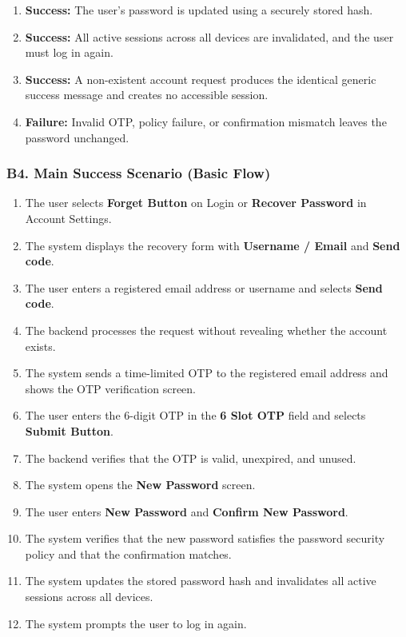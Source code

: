 \documentclass[12pt]{article}
\begin{document}
\begin{enumerate}
\item \textbf{Success:} The user's password is updated using a securely stored hash.
\item \textbf{Success:} All active sessions across all devices are invalidated, and the user must log in again.
\item \textbf{Success:} A non-existent account request produces the identical generic success message and creates no accessible session.
\item \textbf{Failure:} Invalid OTP, policy failure, or confirmation mismatch leaves the password unchanged.
\end{enumerate}
\par\medskip

\hypertarget{sec:b4-main-success-scenario-basic-flow}{}
\subsubsection*{B4. Main Success Scenario (Basic Flow)}
\par\medskip

\begin{enumerate}
\item The user selects \textbf{Forget Button} on Login or \textbf{Recover Password} in Account Settings.
\item The system displays the recovery form with \textbf{Username / Email} and \textbf{Send code}.
\item The user enters a registered email address or username and selects \textbf{Send code}.
\item The backend processes the request without revealing whether the account exists.
\item The system sends a time-limited OTP to the registered email address and shows the OTP verification screen.
\item The user enters the 6-digit OTP in the \textbf{6 Slot OTP} field and selects \textbf{Submit Button}.
\item The backend verifies that the OTP is valid, unexpired, and unused.
\item The system opens the \textbf{New Password} screen.
\item The user enters \textbf{New Password} and \textbf{Confirm New Password}.
\item The system verifies that the new password satisfies the password security policy and that the confirmation matches.
\item The system updates the stored password hash and invalidates all active sessions across all devices.
\item The system prompts the user to log in again.
\end{enumerate}
\par\medskip
\end{document}
